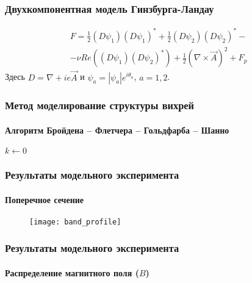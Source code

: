 \begin{frame}
    \frametitle{Двухкомпонентная модель Гинзбурга-Ландау}
    \begin{gather}
        F = \frac{1}{2}(D\psi_1)(D\psi_1)^* + 
            \frac{1}{2}(D\psi_2)(D\psi_2)^* - \nonumber \\ -
            \nu Re\left( (D\psi_1)(D\psi_2)^* \right) +
            \frac{1}{2}\left(\nabla\times\vec{A}\right)^2 + F_p
        \nonumber
    \end{gather}
    Здесь \( D = \nabla + ie\vec{A} \) и \( \psi_a = |\psi_a|e^{i\theta_a} \), 
    \( a = 1,2 \).
\end{frame}

\begin{frame}
    \frametitle{Метод моделирование структуры вихрей}
    \framesubtitle{Алгоритм Бройдена -- Флетчера -- Гольдфарба -- Шанно}
    \begin{center}
        \begin{minipage}{2in}
            \begin{algorithm}[H]
                \scriptsize
                \SetAlgoLined
                $k \gets 0$\;
            \end{algorithm}
        \end{minipage}
    \end{center}
\end{frame}

\begin{frame}
    \frametitle{Результаты модельного эксперимента}
    \framesubtitle{Поперечное сечение}
    \begin{figure}[h]
        \center
        \texttt{[image: band\_profile]}
    \end{figure}
\end{frame}

\begin{frame}
    \frametitle{Результаты модельного эксперимента}
    \framesubtitle{Распределение магнитного поля (\( B \))}
    \begin{figure}[h]
        \begin{minipage}[h]{0.49\linewidth}
            \center{\texttt{[image: 3d\_B]}}
        \end{minipage}
        \hfill
        \begin{minipage}[h]{0.49\linewidth}
        \end{minipage}
    \end{figure}
\end{frame}

